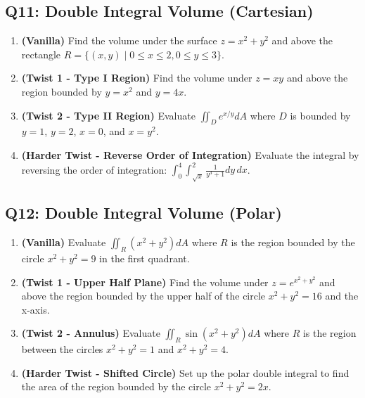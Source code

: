 \documentclass[11pt]{article}
\begin{document}
\subsection{Q11: Double Integral Volume (Cartesian)}
\begin{enumerate}[label=\textbf{11\alph*.}]
    \item \textbf{(Vanilla)} Find the volume under the surface $z = x^2 + y^2$ and above the rectangle $R = \{(x,y) \mid 0 \le x \le 2, 0 \le y \le 3\}$.
    \item \textbf{(Twist 1 - Type I Region)} Find the volume under $z = xy$ and above the region bounded by $y = x^2$ and $y = 4x$.
    \item \textbf{(Twist 2 - Type II Region)} Evaluate $\iint_D e^{x/y} dA$ where $D$ is bounded by $y=1$, $y=2$, $x=0$, and $x=y^2$.
    \item \textbf{(Harder Twist - Reverse Order of Integration)} Evaluate the integral by reversing the order of integration: $\int_0^4 \int_{\sqrt{x}}^2 \frac{1}{y^3 + 1} dy \, dx$.
\end{enumerate}

\subsection{Q12: Double Integral Volume (Polar)}
\begin{enumerate}[label=\textbf{12\alph*.}]
    \item \textbf{(Vanilla)} Evaluate $\iint_R (x^2 + y^2) dA$ where $R$ is the region bounded by the circle $x^2+y^2=9$ in the first quadrant.
    \item \textbf{(Twist 1 - Upper Half Plane)} Find the volume under $z = e^{x^2+y^2}$ and above the region bounded by the upper half of the circle $x^2+y^2=16$ and the x-axis.
    \item \textbf{(Twist 2 - Annulus)} Evaluate $\iint_R \sin(x^2+y^2) dA$ where $R$ is the region between the circles $x^2+y^2=1$ and $x^2+y^2=4$.
    \item \textbf{(Harder Twist - Shifted Circle)} Set up the polar double integral to find the area of the region bounded by the circle $x^2+y^2 = 2x$.
\end{enumerate}
\end{document}
